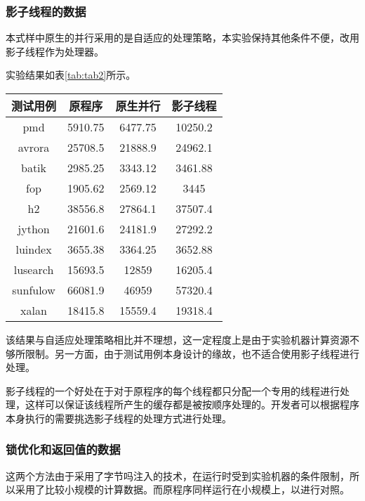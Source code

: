 \subsubsection{影子线程的数据}

本式样中原生的并行采用的是自适应的处理策略，本实验保持其他条件不便，改用影子线程作为处理器。

实验结果如表\ref{tab:tab2}所示。

\begin{table}[htbp]
	\centering
	\begin{tabular}{c|c|c|c}
		\hline
		测试用例 & 原程序 & 原生并行 & 影子线程 \\
		\hline
		pmd & 5910.75 & 6477.75 & 10250.2 \\
		\hline
		avrora & 25708.5 & 21888.9 & 24962.1 \\
		\hline
		batik & 2985.25 & 3343.12 & 3461.88 \\
		\hline
		fop & 1905.62 & 2569.12 & 3445 \\
		\hline
		h2 & 38556.8 & 27864.1 & 37507.4 \\
		\hline
		jython & 21601.6 & 24181.9 & 27292.2 \\
		\hline
		luindex & 3655.38 & 3364.25 & 3652.88 \\
		\hline
		lusearch & 15693.5 & 12859 & 16205.4 \\
		\hline
		sunfulow & 66081.9 & 46959 & 57320.4 \\
		\hline
		xalan & 18415.8 & 15559.4 & 19318.4 \\
		\hline
	\end{tabular}
\end{table}

该结果与自适应处理策略相比并不理想，这一定程度上是由于实验机器计算资源不够所限制。另一方面，由于测试用例本身设计的缘故，也不适合使用影子线程进行处理。

影子线程的一个好处在于对于原程序的每个线程都只分配一个专用的线程进行处理，这样可以保证该线程所产生的缓存都是被按顺序处理的。开发者可以根据程序本身执行的需要挑选影子线程的处理方式进行处理。

\subsubsection{锁优化和返回值的数据}

这两个方法由于采用了字节吗注入的技术，在运行时受到实验机器的条件限制，所以采用了比较小规模的计算数据。而原程序同样运行在小规模上，以进行对照。

